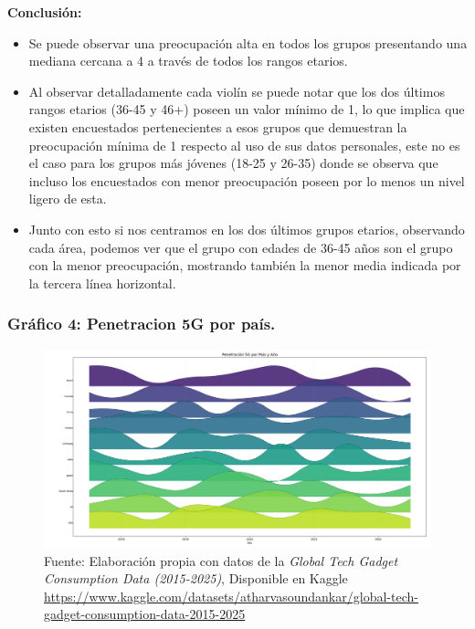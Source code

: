 \documentclass[12pt, a4paper]{article}
\begin{document}
\textbf{Conclusión:}  
\begin{itemize}
    \item Se puede observar una preocupación alta en todos los grupos presentando una mediana cercana a 4 a través de todos los rangos etarios.
    \item Al observar detalladamente cada violín se puede notar que los dos últimos rangos etarios (36-45 y 46+) poseen un valor mínimo de 1, lo que implica que existen encuestados pertenecientes a esos grupos que demuestran la preocupación mínima de 1 respecto al uso de sus datos personales, este no es el caso para los grupos más jóvenes (18-25 y 26-35) donde se observa que incluso los encuestados con menor preocupación poseen por lo menos un nivel ligero de esta.
    \item Junto con esto si nos centramos en los dos últimos grupos etarios, observando cada área, podemos ver que el grupo con edades de 36-45 años son el grupo con la menor preocupación, mostrando también la menor media indicada por la tercera línea horizontal.
\end{itemize}

\subsubsection*{Gráfico 4: Penetracion 5G por país.}
\begin{figure}[H]
    \centering
    \includegraphics[width=1\textwidth]{images/joyplot_penetracion5g.png}
    \caption{
        Fuente: Elaboración propia con datos de la
        \textit{Global Tech Gadget Consumption Data (2015-2025)},
        Disponible en Kaggle \url{https://www.kaggle.com/datasets/atharvasoundankar/global-tech-gadget-consumption-data-2015-2025}
    }

\end{figure}
\end{document}

